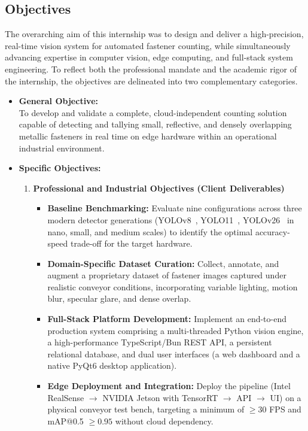 \subsection{Objectives}
\label{sec:objectives}

The overarching aim of this internship was to design and deliver a high-precision, real-time vision system for automated fastener counting, while simultaneously advancing expertise in computer vision, edge computing, and full-stack system engineering. To reflect both the professional mandate and the academic rigor of the internship, the objectives are delineated into two complementary categories.

\begin{itemize}
    \item \textbf{General Objective:} \\
    To develop and validate a complete, cloud-independent counting solution capable of detecting and tallying small, reflective, and densely overlapping metallic fasteners in real time on edge hardware within an operational industrial environment.

    \item \textbf{Specific Objectives:}
    \begin{enumerate}
        \item[\textbf{A.}] \textbf{Professional and Industrial Objectives (Client Deliverables)}
        \begin{itemize}
            \item \textbf{Baseline Benchmarking:} Evaluate nine configurations across three modern detector generations (YOLOv8~\cite{yaseen2024yolov8indepthexplorationinternal}, YOLO11~\cite{khanam2024yolov11overviewkeyarchitectural}, YOLOv26~\cite{jocher2026ultralyticsyolo26unifiedrealtime} in nano, small, and medium scales) to identify the optimal accuracy-speed trade-off for the target hardware.
            \item \textbf{Domain-Specific Dataset Curation:} Collect, annotate, and augment a proprietary dataset of fastener images captured under realistic conveyor conditions, incorporating variable lighting, motion blur, specular glare, and dense overlap.
            \item \textbf{Full-Stack Platform Development:} Implement an end-to-end production system comprising a multi-threaded Python vision engine, a high-performance TypeScript/Bun REST API, a persistent relational database, and dual user interfaces (a web dashboard and a native PyQt6 desktop application).
            \item \textbf{Edge Deployment and Integration:} Deploy the pipeline (Intel RealSense $\rightarrow$ NVIDIA Jetson with TensorRT $\rightarrow$ API $\rightarrow$ UI) on a physical conveyor test bench, targeting a minimum of $\geq 30$ FPS and mAP@0.5 $\geq 0.95$ without cloud dependency.
        \end{itemize}


\end{enumerate}
\end{itemize}
